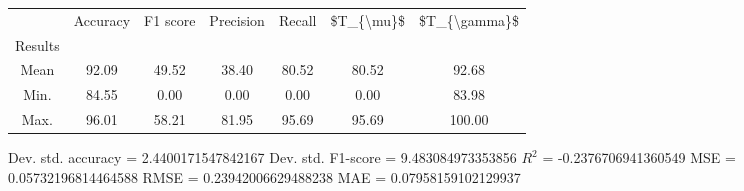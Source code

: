 \begin{tabular}{|c|c|c|c|c|c|c|}
\toprule
{} &  Accuracy &  F1 score &  Precision &  Recall &  \$T\_\{\textbackslash mu\}\$ &  \$T\_\{\textbackslash gamma\}\$ \\
Results &           &           &            &         &            &               \\
\hline
Mean    &     92.09 &     49.52 &      38.40 &   80.52 &      80.52 &         92.68 \\
Min.    &     84.55 &      0.00 &       0.00 &    0.00 &       0.00 &         83.98 \\
Max.    &     96.01 &     58.21 &      81.95 &   95.69 &      95.69 &        100.00 \\
\bottomrule
\end{tabular}

 Dev. std. accuracy = 2.4400171547842167
 Dev. std. F1-score = 9.483084973353856
 $R^2$ = -0.2376706941360549
 MSE = 0.05732196814464588
 RMSE = 0.23942006629488238
 MAE = 0.07958159102129937